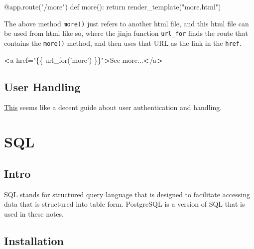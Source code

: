 \documentclass[]{book}
\newenvironment{Shaded}{\begin{snugshade}}{\end{snugshade}}
\newcommand{\BuiltInTok}[1]{#1}
\newcommand{\ExtensionTok}[1]{#1}
\newcommand{\NormalTok}[1]{#1}
\newcommand{\OperatorTok}[1]{\textcolor[rgb]{0.81,0.36,0.00}{\textbf{#1}}}
\newcommand{\StringTok}[1]{\textcolor[rgb]{0.31,0.60,0.02}{#1}}
\begin{document}
\begin{Shaded}
\begin{Highlighting}[]
\ExtensionTok{@app.route}\NormalTok{(}\StringTok{"/more"}\NormalTok{)}
\ExtensionTok{def}\NormalTok{ more()}\BuiltInTok{:}
    \BuiltInTok{return}\NormalTok{ render_template(}\StringTok{"more.html"}\NormalTok{)}
\end{Highlighting}
\end{Shaded}

The above method \texttt{more()} just refers to another html file, and this html file can be used from html like so, where the jinja function \texttt{url\_for} finds the route that contains the \texttt{more()} method, and then uses that URL as the link in the \texttt{href}.

\begin{Shaded}
\begin{Highlighting}[]
\OperatorTok{<}\ExtensionTok{a}\NormalTok{ href=}\StringTok{"\{\{ url_for('more') \}\}"}\OperatorTok{>}\NormalTok{See more...}\OperatorTok{<}\NormalTok{/a}\OperatorTok{>}
\end{Highlighting}
\end{Shaded}

\hypertarget{user-handling}{%
\section{User Handling}\label{user-handling}}

\href{http://exploreflask.com/en/latest/users.html\#authentication}{This} seems like a decent guide about user authentication and handling.

\hypertarget{sql}{%
\chapter{SQL}\label{sql}}

\hypertarget{intro-2}{%
\section{Intro}\label{intro-2}}

SQL stands for structured query language that is designed to facilitate accessing data that is structured into table form. PostgreSQL is a version of SQL that is used in these notes.

\hypertarget{installation}{%
\section{Installation}\label{installation}}
\end{document}
